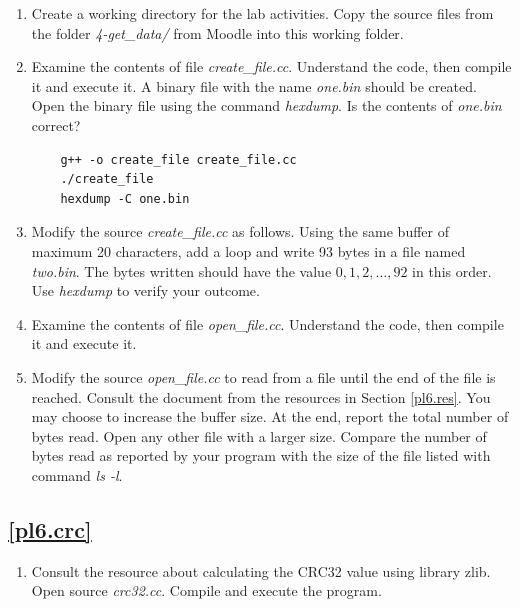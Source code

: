 \documentclass[12pt]{book}
\begin{document}
\begin{enumerate}[label=\arabic*.]
\begin{enumerate}[label=Activity \arabic*)]
\item Create a working directory for the lab activities. Copy the source files from the folder \emph{4-get\_data/} from Moodle into this working folder.

\item Examine the contents of file \emph{create\_file.cc}. Understand the code, then compile it and execute it. A binary file with the name \emph{one.bin} should be created. Open the binary file using the command \emph{hexdump}. Is the contents of \emph{one.bin} correct?

  \begin{lstlisting}
    g++ -o create_file create_file.cc
    ./create_file
    hexdump -C one.bin
  \end{lstlisting}

\item Modify the source \emph{create\_file.cc} as follows. Using the same buffer of maximum 20 characters, add a loop and write 93 bytes in a file named \emph{two.bin}. The bytes written should have the value $0, 1, 2, \ldots, 92$ in this order. Use \emph{hexdump} to verify your outcome.

\item Examine the contents of file \emph{open\_file.cc}. Understand the code, then compile it and execute it.

\item Modify the source \emph{open\_file.cc} to read from a file until the end of the file is reached. Consult the document from the resources in Section \ref*{pl6.res}. You may choose to increase the buffer size. At the end, report the total number of bytes read. Open any other file with a larger size. Compare the number of bytes read as reported by your program with the size of the file listed with command \emph{ls -l}.

\end{enumerate}


\subsection{\ref{pl6.crc}}

\begin{enumerate}[resume*]
\item Consult the resource about calculating the CRC32 value using library zlib. Open source \emph{crc32.cc}. Compile and execute the program.


\end{enumerate}
\end{enumerate}
\end{document}
